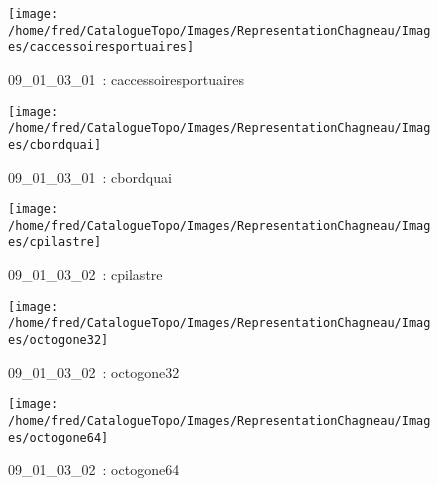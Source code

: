 \documentclass[12pt,titlepage]{book}
\begin{document}
\begin{figure}[h!]
  \hfill         %
  \begin{minipage}[t]{3cm}
    \begin{center}
      \texttt{[image: /home/fred/CatalogueTopo/Images/RepresentationChagneau/Images/caccessoiresportuaires]}
      \caption[~09\_01\_03\_01]{\small{09\_01\_03\_01~:} \tiny{caccessoiresportuaires}}\label{caccessoiresportuaires}
    \end{center}
  \end{minipage}
  \begin{minipage}[t]{3cm}
    \begin{center}
      \texttt{[image: /home/fred/CatalogueTopo/Images/RepresentationChagneau/Images/cbordquai]}
      \caption[~09\_01\_03\_01]{\small{09\_01\_03\_01~:} \tiny{cbordquai}}\label{cbordquai}
    \end{center}
  \end{minipage}
  \begin{minipage}[t]{3cm}
    \begin{center}
      \texttt{[image: /home/fred/CatalogueTopo/Images/RepresentationChagneau/Images/cpilastre]}
      \caption[~09\_01\_03\_02]{\small{09\_01\_03\_02~:} \tiny{cpilastre}}\label{cpilastre}
    \end{center}
  \end{minipage}
  \begin{minipage}[t]{3cm}
    \begin{center}
      \texttt{[image: /home/fred/CatalogueTopo/Images/RepresentationChagneau/Images/octogone32]}
      \caption[~09\_01\_03\_02]{\small{09\_01\_03\_02~:} \tiny{octogone32}}\label{octogone32}
    \end{center}
  \end{minipage}
  \begin{minipage}[t]{3cm}
    \begin{center}
      \texttt{[image: /home/fred/CatalogueTopo/Images/RepresentationChagneau/Images/octogone64]}
      \caption[~09\_01\_03\_02]{\small{09\_01\_03\_02~:} \tiny{octogone64}}\label{octogone64}
    \end{center}
  \end{minipage}
  \begin{minipage}[t]{3cm}

\end{minipage}
\end{figure}
\end{document}
